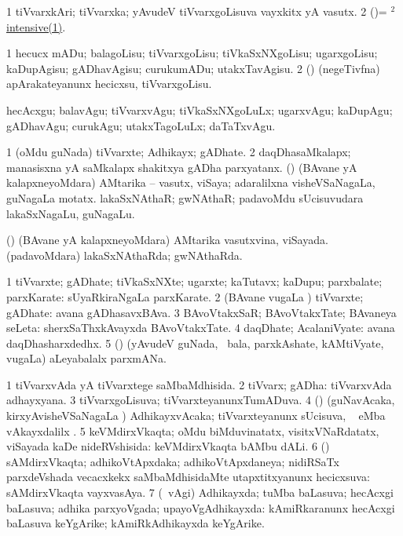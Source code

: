 \bentry
{}
\gl{\nA}
\bmng
\bnum
\num{1} tiVvarxkAri; tiVvarxka; yAvudeV tiVvarxgoLisuva vayxkitx yA vasutx. 
\num{2} (\vAyx)= \hyperlink{intensive(2)}{$^2$intensive(1)}. 
\enum
\emng
\eentry

\bentry
{}
\gl{\sakirx}
\bmng
\bnum
\num{1} hecucx mADu; balagoLisu; tiVvarxgoLisu; tiVkaSxNXgoLisu; ugarxgoLisu; kaDupAgisu; gADhavAgisu; curukumADu; utakxTavAgisu. 
\num{2} (\CA) (negeTivfna) apArakateyanunx hecicxsu, tiVvarxgoLisu. 
\enum
\emng

\noindent 
\gl{\akirx}
\bmng
hecAcxgu; balavAgu; tiVvarxvAgu; tiVkaSxNXgoLuLx; ugarxvAgu; kaDupAgu; gADhavAgu; curukAgu; utakxTagoLuLx; daTaTxvAgu. 
\emng
\eentry

\bentry
{}
\gl{\nA}
\bmng
\bnum
\num{1} (oMdu guNada) tiVvarxte; Adhikayx; gADhate. 
\num{2} daqDhasaMkalapx; manasisxna yA saMkalapx shakitxya gADha parxyatanx. 
 (\takaR) 
\banum
{} (BAvane yA kalapxneyoMdara) AMtarika -- vasutx, viSaya; adaralilxna visheVSaNagaLa, guNagaLa motatx. 
 lakaSxNAthaR; gwNAthaR; padavoMdu sUcisuvudara lakaSxNagaLu, guNagaLu. 
\eanum
\numie
\enum
\emng
\eentry

\bentry
{}
\gl{\gu}
\bmng
(\takaR) 
\banum
{} (BAvane yA kalapxneyoMdara) AMtarika vasutxvina, viSayada. 
 (padavoMdara) lakaSxNAthaRda; gwNAthaRda. 
\eanum
\emng
\eentry

\bentry
{}
\gl{\nA}
\bmng
\bnum
\num{1} tiVvarxte; gADhate; tiVkaSxNXte; ugarxte; kaTutavx; kaDupu; parxbalate; parxKarate:  sUyaRkiraNgaLa parxKarate. 
\num{2} (BAvane \mo vugaLa \vi) tiVvarxte; gADhate:  avana gADhasavxBAva. 
\num{3} BAvoVtakxSaR; BAvoVtakxTate; BAvaneya seLeta:  sherxSaThxkAvayxda BAvoVtakxTate. 
\num{4} daqDhate; AcalaniVyate:  avana daqDhasharxdedhx. 
\num{5} (\Bwvi) (yAvudeV guNada, \udA\ bala, parxkAshate, kAMtiVyate, \mo vugaLa) aLeyabalalx parxmANa. 
\enum
\emng
\eentry

\bentry
{}
\gl{\gu}
\bmng
\bnum
\num{1} tiVvarxvAda yA tiVvarxtege saMbaMdhisida. 
\num{2} tiVvarx; gADha:  tiVvarxvAda adhayxyana. 
\num{3} tiVvarxgoLisuva; tiVvarxteyanunxTumADuva. 
\num{4} (\vAyx) (guNavAcaka, kirxyAvisheVSaNagaLa \vi) AdhikayxvAcaka; tiVvarxteyanunx sUcisuva, \udA\  eMba vAkayxdalilx . 
\num{5} keVMdirxVkaqta; oMdu biMduvinatatx, visitxVNaRdatatx, viSayada kaDe nideRVshisida:  keVMdirxVkaqta bAMbu dALi. 
\num{6} (\athaRshA) sAMdirxVkaqta; adhikoVtApxdaka; adhikoVtApxdaneya; nidiRSaTx parxdeVshada vecacxkekx saMbaMdhisidaMte utapxtitxyanunx hecicxsuva:  sAMdirxVkaqta vayxvasAya. 
\num{7} (\sA\ \sapUpa vAgi) Adhikayxda; tuMba baLasuva; hecAcxgi baLasuva; adhika parxyoVgada; upayoVgAdhikayxda:  kAmiRkaranunx hecAcxgi baLasuva keYgArike; kAmiRkAdhikayxda keYgArike. 
\enum
\emng
\eentry

